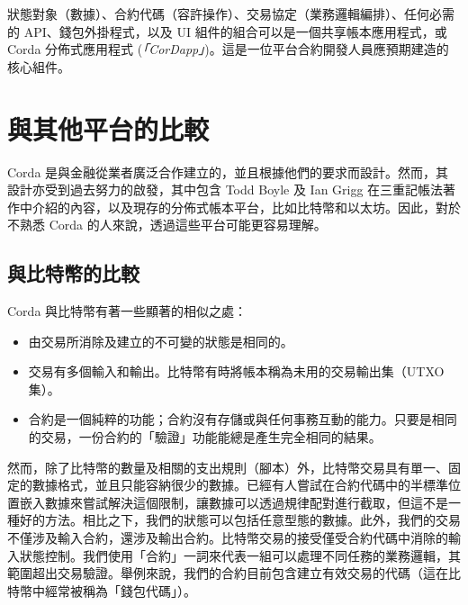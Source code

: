\documentclass[UTF8]{ctexart}
\begin{document}
狀態對象（數據）、合約代碼（容許操作）、交易協定（業務邏輯編排）、任何必需的 API、錢包外掛程式，以及 UI 組件的組合可以是一個共享帳本應用程式，或 Corda 分佈式應用程式 (\textit{「CorDapp」})。這是一位平台合約開發人員應預期建造的核心組件。 



\section{與其他平台的比較}
Corda 是與金融從業者廣泛合作建立的，並且根據他們的要求而設計。然而，其設計亦受到過去努力的啟發，其中包含 Todd Boyle 及 Ian Grigg 在三重記帳法\cite{Triple}著作中介紹的內容，以及現存的分佈式帳本平台，比如比特幣\cite{Bitcoin}和以太坊。因此，對於不熟悉 Corda 的人來說，透過這些平台可能更容易理解。 

\subsection{與比特幣的比較}
Corda 與比特幣有著一些顯著的相似之處： 
\begin{itemize}
\item{由交易所消除及建立的不可變的狀態是相同的。}
\item{交易有多個輸入和輸出。比特幣有時將帳本稱為未用的交易輸出集（UTXO 集）。}
\item{合約是一個純粹的功能；合約沒有存儲或與任何事務互動的能力。只要是相同的交易，一份合約的「驗證」功能能總是產生完全相同的結果。}
\end{itemize}

然而，除了比特幣的數量及相關的支出規則（腳本）外，比特幣交易具有單一、固定的數據格式，並且只能容納很少的數據。已經有人嘗試在合約代碼中的半標準位置嵌入數據來嘗試解決這個限制，讓數據可以透過規律配對進行截取，但這不是一種好的方法。相比之下，我們的狀態可以包括任意型態的數據。此外，我們的交易不僅涉及輸入合約，還涉及輸出合約。比特幣交易的接受僅受合約代碼中消除的輸入狀態控制。我們使用「合約」一詞來代表一組可以處理不同任務的業務邏輯，其範圍超出交易驗證。舉例來說，我們的合約目前包含建立有效交易的代碼（這在比特幣中經常被稱為「錢包代碼」）。
\end{document}
